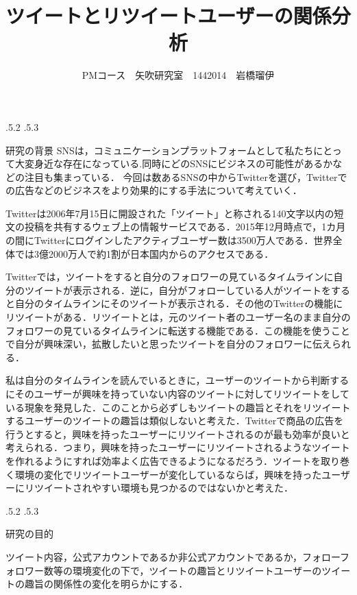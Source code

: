 \documentclass[uplatex]{jsarticle}
\title{\vspace{-14mm}ツイートとリツイートユーザーの関係分析}
\author{PMコース　矢吹研究室　1442014　岩橋瑠伊}
\date{}%
\makeatletter
\renewcommand{\section}{%
    \if@slide\clearpage\fi
    \@startsection{section}{1}{\z@}%
    {\Cvs \@plus.5\Cdp \@minus.2\Cdp}%
    {.5\Cvs \@plus.3\Cdp}%
    {\normalfont\raggedright}}
\makeatother
\begin{document}
\maketitle





\section{研究の背景}
SNSは，コミュニケーションプラットフォームとして私たちにとって大変身近な存在になっている.同時にどのSNSにビジネスの可能性があるかなどの注目も集まっている．
今回は数あるSNSの中からTwitterを選び，Twitterでの広告などのビジネスをより効果的にする手法について考えていく\cite{sns}．

Twitterは2006年7月15日に開設された「ツイート」と称される140文字以内の短文の投稿を共有するウェブ上の情報サービスである．2015年12月時点で，1カ月の間にTwitterにログインしたアクティブユーザー数は3500万人である．世界全体では3億2000万人で約1割が日本国内からのアクセスである\cite{twitter}．

Twitterでは，ツイートをすると自分のフォロワーの見ているタイムラインに自分のツイートが表示される．逆に，自分がフォローしている人がツイートをすると自分のタイムラインにそのツイートが表示される．その他のTwitterの機能にリツイートがある．リツイートとは，元のツイート者のユーザー名のまま自分のフォロワーの見ているタイムラインに転送する機能である．この機能を使うことで自分が興味深い，拡散したいと思ったツイートを自分のフォロワーに伝えられる．

私は自分のタイムラインを読んでいるときに，ユーザーのツイートから判断するにそのユーザーが興味を持っていない内容のツイートに対してリツイートをしている現象を発見した．このことから必ずしもツイートの趣旨とそれをリツイートするユーザーのツイートの趣旨は類似しないと考えた．Twitterで商品の広告を行うとすると，興味を持ったユーザーにリツイートされるのが最も効率が良いと考えられる．つまり，興味を持ったユーザーにリツイートされるようなツイートを作れるようにすれば効率よく広告できるようになるだろう．ツイートを取り巻く環境の変化でリツイートユーザーが変化しているならば，興味を持ったユーザーにリツイートされやすい環境も見つかるのではないかと考えた．

\section{研究の目的}

ツイート内容，公式アカウントであるか非公式アカウントであるか，フォローフォロワー数等の環境変化の下で，ツイートの趣旨とリツイートユーザーのツイートの趣旨の関係性の変化を明らかにする．
\end{document}
